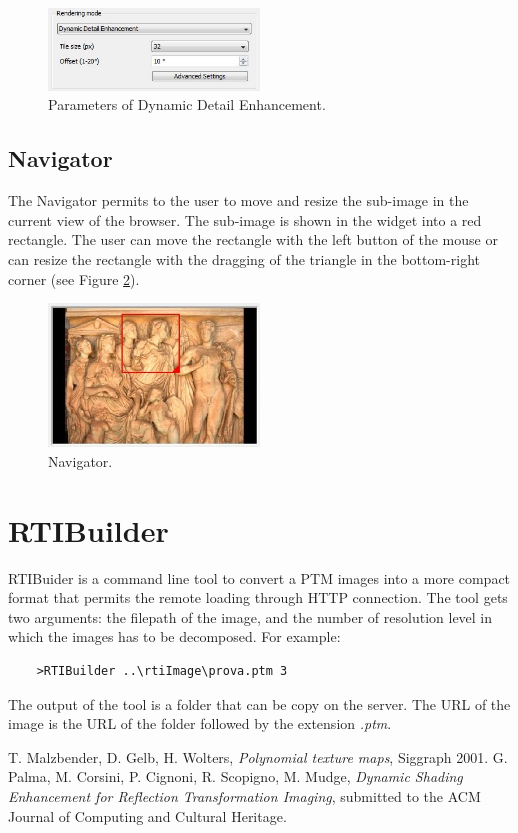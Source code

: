 \documentclass[oneside, 11pt]{book}
\begin{document}
\begin{figure}[hbt]
  \centering
  \includegraphics[width=0.5\textwidth]{dyn_detail_enh}
  \caption{Parameters of Dynamic Detail Enhancement.}
  \label{fig:dynDetail}
\end{figure}


\section{Navigator}
The Navigator permits to the user to move and resize the sub-image in the current view of the browser. The sub-image is shown in the widget into a red rectangle. The user can move the rectangle with the left button of the mouse or can resize the rectangle with the dragging of the triangle in the bottom-right corner (see Figure \ref{fig:navigator}).

\begin{figure}[hbt]
  \centering
  \includegraphics[width=0.5\textwidth]{navigator}
  \caption{Navigator.}
  \label{fig:navigator}
\end{figure}


\chapter{RTIBuilder}\label{rtibuilder}
RTIBuider is a command line tool to convert a PTM images into a more compact format that permits the remote loading through HTTP connection. The tool gets two arguments: the filepath of the image, and the number of resolution level in which the images has to be decomposed. For example:
 \begin{verbatim}
    >RTIBuilder ..\rtiImage\prova.ptm 3
 \end{verbatim}
The output of the tool is a folder that can be copy on the server. The URL of the image is the URL of the folder followed by the extension \emph{.ptm}.

\begin{thebibliography}{100}
 T. Malzbender, D. Gelb, H. Wolters, \emph{Polynomial texture maps}, Siggraph 2001.
 G. Palma, M. Corsini, P. Cignoni, R. Scopigno, M. Mudge, \emph{Dynamic Shading Enhancement for Reflection Transformation Imaging}, submitted to the ACM Journal of Computing and Cultural Heritage.
\end{thebibliography}
\end{document}
